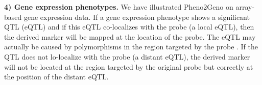 {\bf 4) Gene expression phenotypes.}
We have illustrated Pheno2Geno on array-based gene expression data. If a gene expression 
phenotype shows a significant QTL (eQTL) and if this eQTL co-localizes with the probe (a 
local eQTL), then the derived marker will be mapped at the location of the probe. The eQTL 
may actually be caused by polymorphisms in the region targeted by the probe \cite{Alberts:2005, 
Alberts:2007}. If the QTL does not lo-localize with the probe (a distant eQTL), the derived 
marker will not be located at the region targeted by the original probe but correctly at the 
position of the distant eQTL.

